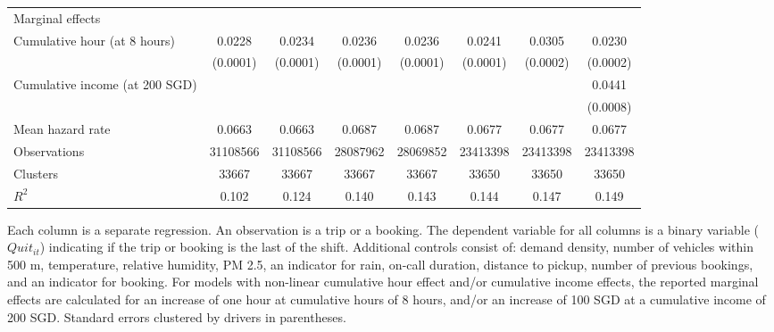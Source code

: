 \documentclass[reviewmode]{restat}
\begin{document}
\begin{table}
\begin{tabularx}{\textwidth}{l@{\extracolsep{\fill}}*{7}{S}}
        \midrule
        Marginal effects & & & & & &\\
        \quad Cumulative hour (at 8 hours)&      0.0228&      0.0234&      0.0236&      0.0236&      0.0241&      0.0305&      0.0230\\
                    &    (0.0001)&    (0.0001)&    (0.0001)&    (0.0001)&    (0.0001)&    (0.0002)&    (0.0002)\\
        \addlinespace
        \quad Cumulative income (at 200 SGD)&            &            &            &            &            &            &      0.0441\\
                    &         &         &         &         &         &         &    (0.0008)\\
        \midrule
        Mean hazard rate&      0.0663&      0.0663&      0.0687&      0.0687&      0.0677&      0.0677&      0.0677\\
        Observations&\num{31108566}&\num{31108566}&\num{28087962}&\num{28069852}&\num{23413398}&\num{23413398}&\num{23413398}\\
        Clusters    & \num{33667}& \num{33667}& \num{33667}& \num{33667}& \num{33650}& \num{33650}& \num{33650}\\
        \(R^2\)     &       0.102&       0.124&       0.140&       0.143&       0.144&       0.147&       0.149\\
        \bottomrule
    \end{tabularx}

	\begin{tablenotes}
        Each column is a separate regression. An observation is a trip or a booking. The dependent variable for all columns is a binary variable ($Quit_{it}$) indicating if the trip or booking is the last of the shift. Additional controls consist of: demand density, number of vehicles within 500 m, temperature, relative humidity, PM 2.5, an indicator for rain, on-call duration, distance to pickup, number of previous bookings, and an indicator for booking. For models with non-linear cumulative hour effect and/or cumulative income effects, the reported marginal effects are calculated for an increase of one hour at cumulative hours of 8 hours, and/or an increase of 100 SGD at a cumulative income of 200 SGD.  Standard errors clustered by drivers in parentheses. 
	\end{tablenotes}
\end{table}
\end{document}
